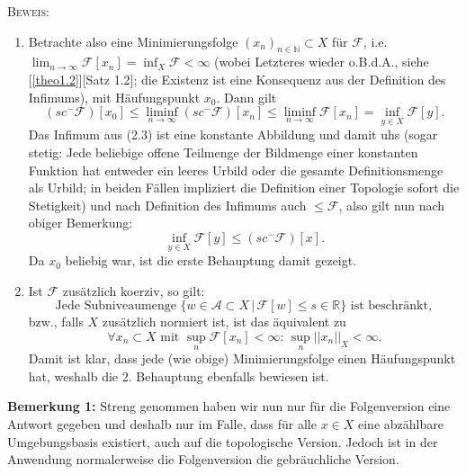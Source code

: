 \textsc{Beweis:} 
\begin{enumerate}
    \item Betrachte also eine Minimierungsfolge \((x_n)_{n \in \mathbb{N}} \subset X\) für \(\mathcal{F}\), i.e. \(\lim_{n \to \infty} \mathcal{F}[x_n] = \inf_X \mathcal{F} < \infty\) (wobei Letzteres wieder o.B.d.A., siehe [\ref{theo1.2}][Satz 1.2]; die Existenz ist eine Konsequenz aus der Definition des Infimums), mit Häufungspunkt \(x_0\). Dann gilt
    \begin{equation}
        (sc^- \mathcal{F})[x_0] \le \liminf_{n \to \infty} (sc^- \mathcal{F})[x_n] \le \liminf_{n \to \infty} \mathcal{F}[x_n] = \inf_{y \in X} \mathcal{F}[y].
    \end{equation}
    Das Infimum aus (2.3) ist eine konstante Abbildung und damit uhs (sogar stetig: Jede beliebige offene Teilmenge der Bildmenge einer konstanten Funktion hat entweder ein leeres Urbild oder die gesamte Definitionsmenge als Urbild; in beiden Fällen impliziert die Definition einer Topologie sofort die Stetigkeit) und nach Definition des Infimums auch \(\le \mathcal{F}\), also gilt nun nach obiger Bemerkung: 
    \begin{equation}
        \inf_{y \in X} \mathcal{F}[y] \le (sc^- \mathcal{F})[x].
    \end{equation}
    Da \(x_0\) beliebig war, ist die erste Behauptung damit gezeigt.
    \item Ist \(\mathcal{F}\) zusätzlich koerziv, so gilt:
    \begin{equation}
        \text{Jede Subniveaumenge }\{w \in \mathcal{A} \subset X\, | \, \mathcal{F}[w] \le s \in \mathbb{R}\} \text{ ist beschränkt},
    \end{equation}
    bzw., falls \(X\) zusätzlich normiert ist, ist das äquivalent zu
    \begin{equation}
        \forall x_n \subset X\text{ mit } \sup_{n} \mathcal{F}[x_n] < \infty:\, \sup_n ||x_n||_{X} < \infty.
    \end{equation}
    Damit ist klar, dass jede (wie obige) Minimierungsfolge einen Häufungspunkt hat, weshalb die 2. Behauptung ebenfalls bewiesen ist.\QEDB\\
\end{enumerate}

\textbf{Bemerkung 1:} Streng genommen haben wir nun nur für die Folgenversion eine Antwort gegeben und deshalb nur im Falle, dass für alle \(x \in X\) eine abzählbare Umgebungsbasis existiert, auch auf die topologische Version. Jedoch ist in der Anwendung normalerweise die Folgenversion die gebräuchliche Version.\\


